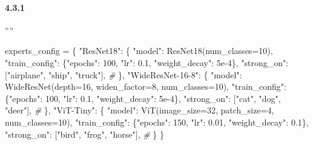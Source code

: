 \documentclass[
  12pt,
]{article}
\newenvironment{Shaded}{}{}
\newcommand{\CommentTok}[1]{\textcolor[rgb]{0.38,0.63,0.69}{\textit{#1}}}
\newcommand{\DecValTok}[1]{\textcolor[rgb]{0.25,0.63,0.44}{#1}}
\newcommand{\FloatTok}[1]{\textcolor[rgb]{0.25,0.63,0.44}{#1}}
\newcommand{\NormalTok}[1]{#1}
\newcommand{\OperatorTok}[1]{\textcolor[rgb]{0.40,0.40,0.40}{#1}}
\newcommand{\StringTok}[1]{\textcolor[rgb]{0.25,0.44,0.63}{#1}}
\begin{document}
\paragraph{4.3.1 }\label{ux4e13ux5bb6ux5b9aux4e49}

''''

\begin{Shaded}
\begin{Highlighting}[]
\NormalTok{experts\_config }\OperatorTok{=}\NormalTok{ \{}
    \StringTok{"ResNet18"}\NormalTok{: \{}
        \StringTok{"model"}\NormalTok{: ResNet18(num\_classes}\OperatorTok{=}\DecValTok{10}\NormalTok{),}
        \StringTok{"train\_config"}\NormalTok{: \{}\StringTok{"epochs"}\NormalTok{: }\DecValTok{100}\NormalTok{, }\StringTok{"lr"}\NormalTok{: }\FloatTok{0.1}\NormalTok{, }\StringTok{"weight\_decay"}\NormalTok{: }\FloatTok{5e{-}4}\NormalTok{\},}
        \StringTok{"strong\_on"}\NormalTok{: [}\StringTok{"airplane"}\NormalTok{, }\StringTok{"ship"}\NormalTok{, }\StringTok{"truck"}\NormalTok{],   }\CommentTok{\# }
\NormalTok{    \},}
    \StringTok{"WideResNet{-}16{-}8"}\NormalTok{: \{}
        \StringTok{"model"}\NormalTok{: WideResNet(depth}\OperatorTok{=}\DecValTok{16}\NormalTok{, widen\_factor}\OperatorTok{=}\DecValTok{8}\NormalTok{, num\_classes}\OperatorTok{=}\DecValTok{10}\NormalTok{),}
        \StringTok{"train\_config"}\NormalTok{: \{}\StringTok{"epochs"}\NormalTok{: }\DecValTok{100}\NormalTok{, }\StringTok{"lr"}\NormalTok{: }\FloatTok{0.1}\NormalTok{, }\StringTok{"weight\_decay"}\NormalTok{: }\FloatTok{5e{-}4}\NormalTok{\},}
        \StringTok{"strong\_on"}\NormalTok{: [}\StringTok{"cat"}\NormalTok{, }\StringTok{"dog"}\NormalTok{, }\StringTok{"deer"}\NormalTok{],           }\CommentTok{\# }
\NormalTok{    \},}
    \StringTok{"ViT{-}Tiny"}\NormalTok{: \{}
        \StringTok{"model"}\NormalTok{: ViT(image\_size}\OperatorTok{=}\DecValTok{32}\NormalTok{, patch\_size}\OperatorTok{=}\DecValTok{4}\NormalTok{, num\_classes}\OperatorTok{=}\DecValTok{10}\NormalTok{),}
        \StringTok{"train\_config"}\NormalTok{: \{}\StringTok{"epochs"}\NormalTok{: }\DecValTok{150}\NormalTok{, }\StringTok{"lr"}\NormalTok{: }\FloatTok{0.01}\NormalTok{, }\StringTok{"weight\_decay"}\NormalTok{: }\FloatTok{0.1}\NormalTok{\},}
        \StringTok{"strong\_on"}\NormalTok{: [}\StringTok{"bird"}\NormalTok{, }\StringTok{"frog"}\NormalTok{, }\StringTok{"horse"}\NormalTok{],        }\CommentTok{\# }
\NormalTok{    \}}
\NormalTok{\}}
\end{Highlighting}
\end{Shaded}
\end{document}
